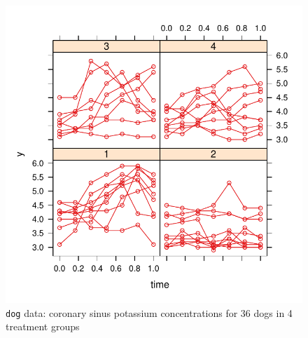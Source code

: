 \documentclass[12pt]{article}
\newcommand{\code}[1]{\texttt{\small{#1}}}
\begin{document}
\begin{figure}[!htbp] \centering
\includegraphics{GAMMsUsingLME4-dogPlot}
\caption{\code{dog} data: coronary sinus potassium concentrations for 36 dogs in 4 treatment groups\label{dogPlot}}                    
\end{figure}
\end{document}
